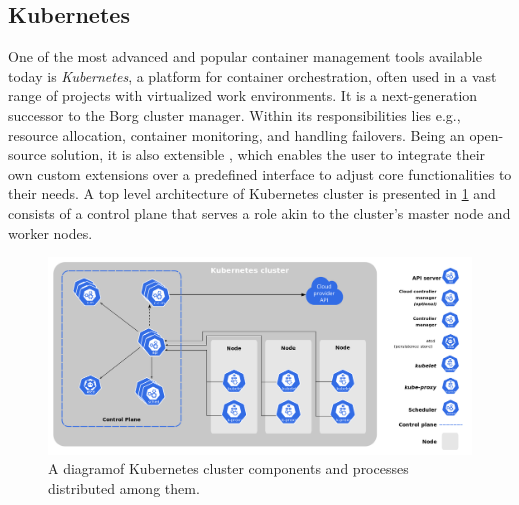 \subsection{Kubernetes}
\label{s:ProblemDomain:Kubernetes}

One of the most advanced and popular container management tools available today is \emph{Kubernetes}, a platform for container orchestration, often used in a vast range of projects with virtualized work environments.
It is a next-generation successor \cite{b:Borg-K8s-predecessor} to the Borg cluster manager.
Within its responsibilities lies e.g., resource allocation, container monitoring, and handling failovers.
Being an open-source solution, it is also extensible \cite{b:Kubernetes-what-is}, which enables the user to integrate their own custom extensions over a predefined interface to adjust core functionalities to their needs. A top level architecture of Kubernetes cluster is presented in \cref{fig:kubernetes:architecture} and consists of a control plane that serves a role akin to the cluster's master node and worker nodes.

\begin{figure}[H]
\centering
\includegraphics[width=1\linewidth]{figures/2-1-k8s-arch.png}
\caption[Kubernetes cluster architecture diagram]{A diagram\footnotemark of Kubernetes cluster components and processes distributed among them.}


\label{fig:kubernetes:architecture}
\end{figure}

